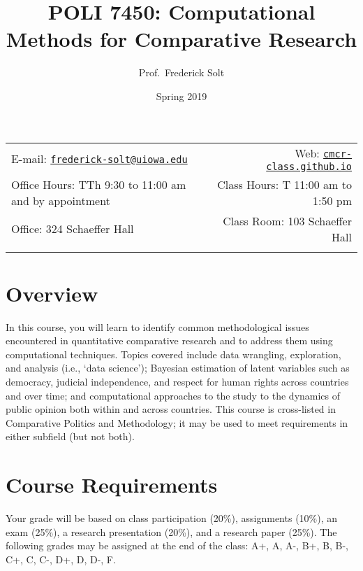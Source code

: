 \documentclass[]{article}
\title{POLI 7450: Computational Methods for Comparative Research}
\author{Prof.~Frederick Solt}
\date{Spring 2019}
\begin{document}
  

		\maketitle
		
	
		\thispagestyle{firststyle}



	\noindent \begin{tabular*}{\textwidth}{ @{\extracolsep{\fill}} lr @{\extracolsep{\fill}}}


E-mail: \texttt{\href{mailto:frederick-solt@uiowa.edu}{\nolinkurl{frederick-solt@uiowa.edu}}} & Web: \href{http://cmcr-class.github.io}{\tt cmcr-class.github.io}\\
Office Hours: TTh 9:30 to 11:00 am and by appointment  &  Class Hours: T 11:00 am to 1:50 pm\\
Office: 324 Schaeffer Hall  & Class Room: 103 Schaeffer Hall\\
	&  \\
	\hline
	\end{tabular*}
	
\vspace{2mm}
	


\hypertarget{overview}{%
\section{Overview}\label{overview}}

In this course, you will learn to identify common methodological issues
encountered in quantitative comparative research and to address them
using computational techniques. Topics covered include data wrangling,
exploration, and analysis (i.e., `data science'); Bayesian estimation of
latent variables such as democracy, judicial independence, and respect
for human rights across countries and over time; and computational
approaches to the study to the dynamics of public opinion both within
and across countries. This course is cross-listed in Comparative
Politics and Methodology; it may be used to meet requirements in either
subfield (but not both).

\hypertarget{course-requirements}{%
\section{Course Requirements}\label{course-requirements}}

Your grade will be based on class participation (20\%), assignments
(10\%), an exam (25\%), a research presentation (20\%), and a research
paper (25\%). The following grades may be assigned at the end of the
class: A+, A, A-, B+, B, B-, C+, C, C-, D+, D, D-, F.
\end{document}
